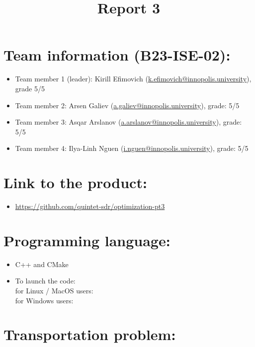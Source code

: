 \documentclass{article}
\title{\textbf{Report 3}}
\author{}
\date{}
\begin{document}
\maketitle

\thispagestyle{fancy}

\section*{Team information (B23-ISE-02):}
\begin{itemize}
\item Team member 1 (leader): Kirill Efimovich (\href{mailto:k.efimovich@innopolis.university}{k.efimovich@innopolis.university}), grade 5/5
\item Team member 2: Arsen Galiev (\href{mailto:a.galiev@innopolis.university}{a.galiev@innopolis.university}), grade: 5/5
\item Team member 3: Asqar Arslanov (\href{mailto:a.arslanov@innopolis.university}{a.arslanov@innopolis.university}), grade: 5/5
\item Team member 4: Ilya-Linh Nguen (\href{mailto:i.nguen@innopolis.university}{i.nguen@innopolis.university}), grade: 5/5
\end{itemize}

\section*{Link to the product:}

\begin{itemize}
\item \url{https://github.com/quintet-sdr/optimization-pt3}
\end{itemize}

\section*{Programming language:}

\begin{itemize}
\item C++ and CMake
\item To launch the code: \\
for Linux / MacOS users:  \\
for Windows users: 
\end{itemize}

\section*{Transportation problem:}
\end{document}
